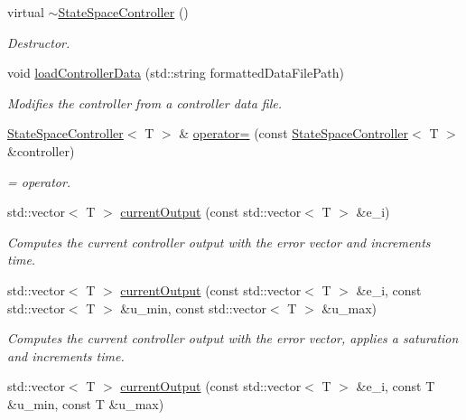 \begin{DoxyCompactItemize}
\mbox{\label{classStateSpaceController_adfc0f7afd0480726658bc675d5c4c8fe}} 
virtual \hyperlink{classStateSpaceController_adfc0f7afd0480726658bc675d5c4c8fe}{$\sim$\+State\+Space\+Controller} ()
\begin{DoxyCompactList}\small\item\em Destructor. \end{DoxyCompactList}\item 
void \hyperlink{classStateSpaceController_a6884754d53bc98c247ac4dd1f39be2ec}{load\+Controller\+Data} (std\+::string formatted\+Data\+File\+Path)
\begin{DoxyCompactList}\small\item\em Modifies the controller from a controller data file. \end{DoxyCompactList}\item 
\hyperlink{classStateSpaceController}{State\+Space\+Controller}$<$ T $>$ \& \hyperlink{classStateSpaceController_ade470a9ad99f273afea7b938560c4f88}{operator=} (const \hyperlink{classStateSpaceController}{State\+Space\+Controller}$<$ T $>$ \&controller)
\begin{DoxyCompactList}\small\item\em = operator. \end{DoxyCompactList}\item 
std\+::vector$<$ T $>$ \hyperlink{classStateSpaceController_a007985a139e8946e1f61e5e402d81d2e}{current\+Output} (const std\+::vector$<$ T $>$ \&e\+\_\+i)
\begin{DoxyCompactList}\small\item\em Computes the current controller output with the error vector and increments time. \end{DoxyCompactList}\item 
std\+::vector$<$ T $>$ \hyperlink{classStateSpaceController_a00b5627d37939d059112a16cf1adf7c9}{current\+Output} (const std\+::vector$<$ T $>$ \&e\+\_\+i, const std\+::vector$<$ T $>$ \&u\+\_\+min, const std\+::vector$<$ T $>$ \&u\+\_\+max)
\begin{DoxyCompactList}\small\item\em Computes the current controller output with the error vector, applies a saturation and increments time. \end{DoxyCompactList}\item 
std\+::vector$<$ T $>$ \hyperlink{classStateSpaceController_adb5f9f36e7ccffe8037b84baa457cbac}{current\+Output} (const std\+::vector$<$ T $>$ \&e\+\_\+i, const T \&u\+\_\+min, const T \&u\+\_\+max)

\end{DoxyCompactItemize}
